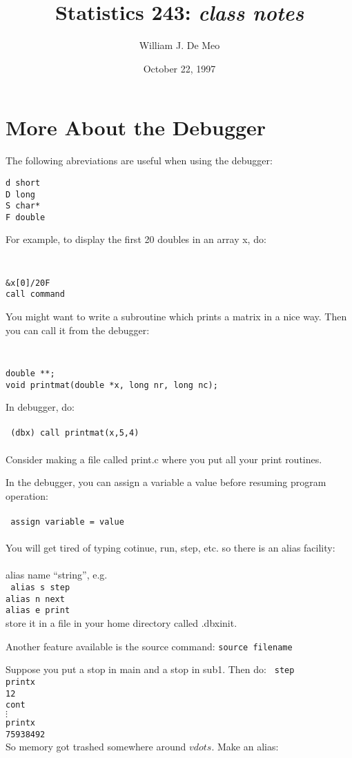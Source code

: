 \documentclass{article}
\begin{document}
\title{Statistics 243: \emph{class notes}}
\author{William J. De Meo}
\date{October 22, 1997 }
\maketitle
\section{More About the Debugger}
The following abreviations are useful when using the debugger:\\
\begin{verbatim}
d short 
D long
S char*
F double
\end{verbatim}
For example, to display the first 20 doubles in an array x, do:\\
{\tt
\begin{verbatim}
&x[0]/20F
call command
\end{verbatim}
}
You might want to write a subroutine which prints a matrix in a nice way.
Then you can call it from the debugger:\\
{\tt  
\begin{verbatim}
double **;
void printmat(double *x, long nr, long nc);
\end{verbatim}
}
In debugger, do:\\\\
{\tt  
(dbx) call printmat(x,5,4)}\\\\
Consider making a file called print.c where you put all your print routines.

In the debugger, you can assign a variable a value before resuming 
program operation:\\\\
{\tt
assign variable = value\\\\
}
You will get tired of typing cotinue, run, step, etc.  so there is 
an alias facility:\\\\
alias name ``string'', e.g.\\
{\tt
alias s step\\
alias n next\\
alias e print\\
}
store it in a file in your home directory called .dbxinit.

Another feature available is the source command: {\tt source filename}

Suppose you put a stop in main and a stop in sub1.  Then do:
{\tt
step\\
printx\\
12\\
cont\\
$\vdots$\\
printx\\
75938492\\
}
So memory got trashed somewhere around $vdots$.  Make an alias:\\\\
\end{document}
